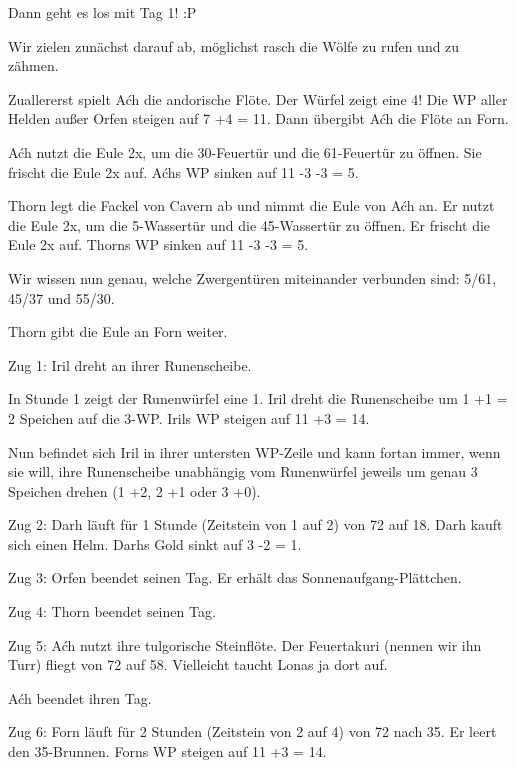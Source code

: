 \documentclass[10pt, a4paper, oneside]{book}
\begin{document}
{Dann geht es los mit Tag 1! :P

Wir zielen zunächst darauf ab, möglichst rasch die Wölfe zu rufen und zu zähmen.



Zuallererst spielt Aćh die andorische Flöte. Der Würfel zeigt eine 4! Die WP aller Helden außer Orfen steigen auf 7 +4 = 11. Dann übergibt Aćh die Flöte an Forn.



Aćh nutzt die Eule 2x, um die 30-Feuertür und die 61-Feuertür zu öffnen. Sie frischt die Eule 2x auf. Aćhs WP sinken auf 11 -3 -3 = 5.

Thorn legt die Fackel von Cavern ab und nimmt die Eule von Aćh an. Er nutzt die Eule 2x, um die 5-Wassertür und die 45-Wassertür zu öffnen. Er frischt die Eule 2x auf. Thorns WP sinken auf 11 -3 -3 = 5.

Wir wissen nun genau, welche Zwergentüren miteinander verbunden sind: 5/61, 45/37 und 55/30.

Thorn gibt die Eule an Forn weiter.



Zug 1: Iril dreht an ihrer Runenscheibe.

In Stunde 1 zeigt der Runenwürfel eine 1. Iril dreht die Runenscheibe um 1 +1 = 2 Speichen auf die 3-WP. Irils WP steigen auf 11 +3 = 14.

Nun befindet sich Iril in ihrer untersten WP-Zeile und kann fortan immer, wenn sie will, ihre Runenscheibe unabhängig vom Runenwürfel jeweils um genau 3 Speichen drehen (1 +2, 2 +1 oder 3 +0).



Zug 2: Darh läuft für 1 Stunde (Zeitstein von 1 auf 2) von 72 auf 18. Darh kauft sich einen Helm. Darhs Gold sinkt auf 3 -2 = 1.



Zug 3: Orfen beendet seinen Tag. Er erhält das Sonnenaufgang-Plättchen.



Zug 4: Thorn beendet seinen Tag.



Zug 5: Aćh nutzt ihre tulgorische Steinflöte. Der Feuertakuri (nennen wir ihn Turr) fliegt von 72 auf 58. Vielleicht taucht Lonas ja dort auf.

Aćh beendet ihren Tag.



Zug 6: Forn läuft für 2 Stunden (Zeitstein von 2 auf 4) von 72 nach 35. Er leert den 35-Brunnen. Forns WP steigen auf 11 +3 = 14.

}
\end{document}
